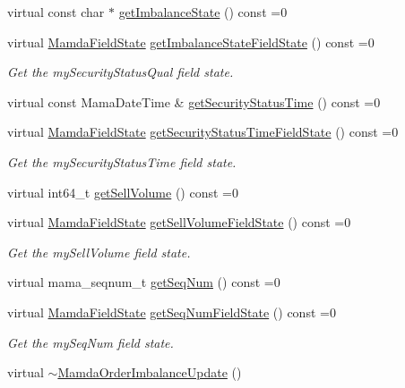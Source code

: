 \begin{CompactItemize}
virtual const char $\ast$ \hyperlink{classWombat_1_1MamdaOrderImbalanceUpdate_4ed34f737d4f4b0d9af5b683ad87f5e6}{get\-Imbalance\-State} () const =0
\item 
virtual \hyperlink{namespaceWombat_93aac974f2ab713554fd12a1fa3b7d2a}{Mamda\-Field\-State} \hyperlink{classWombat_1_1MamdaOrderImbalanceUpdate_2732f39cf68ac3b1a9304b0c5270a180}{get\-Imbalance\-State\-Field\-State} () const =0
\begin{CompactList}\small\item\em Get the my\-Security\-Status\-Qual field state. \item\end{CompactList}\item 
virtual const Mama\-Date\-Time \& \hyperlink{classWombat_1_1MamdaOrderImbalanceUpdate_f98ca9c11930cf69c7d7f80ea5c42a32}{get\-Security\-Status\-Time} () const =0
\item 
virtual \hyperlink{namespaceWombat_93aac974f2ab713554fd12a1fa3b7d2a}{Mamda\-Field\-State} \hyperlink{classWombat_1_1MamdaOrderImbalanceUpdate_155ddac9fba62e41837fc9e1485034a1}{get\-Security\-Status\-Time\-Field\-State} () const =0
\begin{CompactList}\small\item\em Get the my\-Security\-Status\-Time field state. \item\end{CompactList}\item 
virtual int64\_\-t \hyperlink{classWombat_1_1MamdaOrderImbalanceUpdate_060e24ad3311afc17474b38cfebaeb9f}{get\-Sell\-Volume} () const =0
\item 
virtual \hyperlink{namespaceWombat_93aac974f2ab713554fd12a1fa3b7d2a}{Mamda\-Field\-State} \hyperlink{classWombat_1_1MamdaOrderImbalanceUpdate_953bff5b9c9edb2a9e4c1ded09ac9044}{get\-Sell\-Volume\-Field\-State} () const =0
\begin{CompactList}\small\item\em Get the my\-Sell\-Volume field state. \item\end{CompactList}\item 
virtual mama\_\-seqnum\_\-t \hyperlink{classWombat_1_1MamdaOrderImbalanceUpdate_52b8b172678b398d757cd5b3408606c2}{get\-Seq\-Num} () const =0
\item 
virtual \hyperlink{namespaceWombat_93aac974f2ab713554fd12a1fa3b7d2a}{Mamda\-Field\-State} \hyperlink{classWombat_1_1MamdaOrderImbalanceUpdate_28bbf6e096fdc25acd33a9efbc8f4690}{get\-Seq\-Num\-Field\-State} () const =0
\begin{CompactList}\small\item\em Get the my\-Seq\-Num field state. \item\end{CompactList}\item 
virtual \hyperlink{classWombat_1_1MamdaOrderImbalanceUpdate_b20a79356ed58746f3c091dd4fff9d23}{$\sim$Mamda\-Order\-Imbalance\-Update} ()
\end{CompactItemize}


